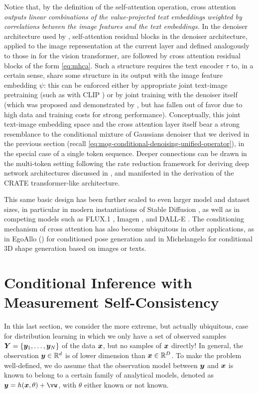\documentclass[../../book-main.tex]{subfiles}
\begin{document}
Notice that, by the definition of the self-attention operation, cross attention
\textit{outputs linear combinations of the value-projected text embeddings
weighted by correlations between the image features and the text embeddings.}
In the denoiser architecture used by \textcite{rombach2022high}, 
self-attention residual blocks in the denoiser architecture, applied to the
image representation at the current layer and defined analogously
to those in  for the vision transformer, are followed by cross
attention residual blocks of the form \eqref{eq:mhca}.
Such a structure requires the text encoder $\tau$ to, in a certain sense, share some
structure in its output with the image feature embedding $\psi$: this can be
enforced either by appropriate joint text-image pretraining (such as with CLIP
\cite{Radford2021-ir}) or by joint training with
the denoiser itself (which was proposed and demonstrated by
\textcite{rombach2022high}, but has fallen out of favor due to high data and
training costs for strong performance).
Conceptually, this joint text-image embedding space and the cross attention
layer itself bear a strong resemblance to the
conditional mixture of Gaussians denoiser that we derived in the previous
section (recall \eqref{eq:mog-conditional-denoising-unified-operator}), in the
special case of a single token sequence. Deeper
connections can be drawn in the multi-token setting following the rate reduction
framework for deriving deep network architectures discussed in
, and manifested in the derivation of the CRATE
transformer-like architecture.

This same basic design has been further scaled to even larger model and dataset
sizes, in particular in modern instantiations of Stable Diffusion
\cite{DBLP:conf/icml/EsserKBEMSLLSBP24}, as well as in competing models such as
FLUX.1 \cite{Labs2025-fb}, Imagen \cite{Saharia2022-na}, and DALL-E \cite{Ramesh2022-nu}. 
The conditioning mechanism of cross attention has also become ubiquitous in
other applications, as in EgoAllo () for conditioned pose generation and in Michelangelo \cite{zhao2023michelangelo} for conditional 3D shape generation based on images or texts. 






\section{Conditional Inference with Measurement Self-Consistency}
\label{sec:measurement-self-consistency}
In this last section, we consider the more extreme, but actually ubiquitous, case for distribution learning in which we only have a set of observed samples $\bm{Y} = \{\bm{y}_1,\ldots, \bm{y}_N\}$ of the data $\bm{x}$, but no samples of $\bm{x}$ directly! In general, the observation $\bm{y} \in \mathbb{R}^d$ is of lower dimension than $\bm{x} \in \mathbb{R}^D$. To make the problem well-defined, we do assume that the observation model between $\bm{y}$ and $\bm{x}$ is known to belong to a certain family of analytical models, denoted as $\y = h(\x, \theta) +\vw$, with $\theta$ either known or not known. 
\end{document}
